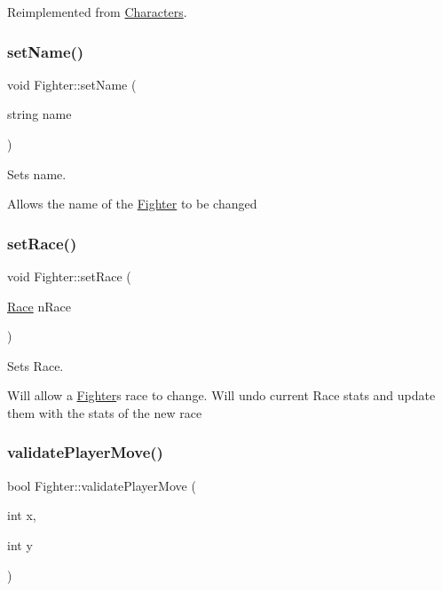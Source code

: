 Reimplemented from \hyperlink{class_characters_ad8eafe3c0b8b2138dc28f4d52050d434}{Characters}.

\hypertarget{class_fighter_af692d6c9b24f902c13bb8b7f3350631e}{}\label{class_fighter_af692d6c9b24f902c13bb8b7f3350631e} 
\subsubsection{\texorpdfstring{set\+Name()}{setName()}}
{\footnotesize\ttfamily void Fighter\+::set\+Name (\begin{DoxyParamCaption}\item[{string}]{name }\end{DoxyParamCaption})}



Sets name. 

Allows the name of the \hyperlink{class_fighter}{Fighter} to be changed \hypertarget{class_fighter_abd0aa443cda40a70c7df3bf1949a9e79}{}\label{class_fighter_abd0aa443cda40a70c7df3bf1949a9e79} 
\subsubsection{\texorpdfstring{set\+Race()}{setRace()}}
{\footnotesize\ttfamily void Fighter\+::set\+Race (\begin{DoxyParamCaption}\item[{\hyperlink{_entity_8h_aa2df4028f474807638d438104900b003}{Race}}]{n\+Race }\end{DoxyParamCaption})}



Sets Race. 

Will allow a \hyperlink{class_fighter}{Fighter}\textquotesingle{}s race to change. Will undo current Race stats and update them with the stats of the new race \hypertarget{class_fighter_ab2a750803d7df7f1d66e9b40074f7a41}{}\label{class_fighter_ab2a750803d7df7f1d66e9b40074f7a41} 
\subsubsection{\texorpdfstring{validate\+Player\+Move()}{validatePlayerMove()}}
{\footnotesize\ttfamily bool Fighter\+::validate\+Player\+Move (\begin{DoxyParamCaption}\item[{int}]{x,  }\item[{int}]{y }\end{DoxyParamCaption})\hspace{0.3cm}{\ttfamily [virtual]}}

